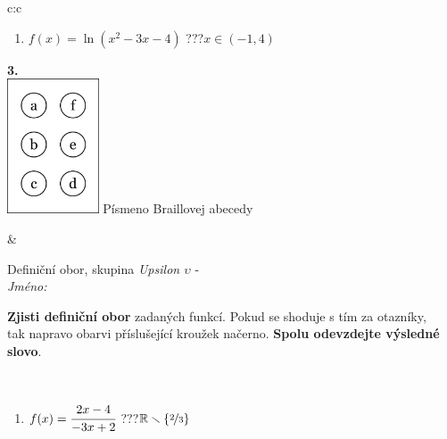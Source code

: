 \documentclass[10pt]{report}
\begin{document}
\begin{tabular}{c:c}
\begin{minipage}[c][104.5mm][t]{0.5\linewidth}
\begin{center}
\begin{minipage}{0.79\linewidth}
\begin{center}
\begin{varwidth}{\linewidth}
\begin{enumerate}
\item $f(x)=\ln{(x^2-3x-4)}$\quad \dotfill\; ???\;\dotfill \quad $x\in(-1 , 4)$
\end{enumerate}
\end{varwidth}
\end{center}
\end{minipage}
\begin{minipage}{0.20\linewidth}
\begin{center}
{\Huge\bfseries 3.} \\[2mm]
\includegraphics[height=40mm]{../images/braille.png}
{\small Písmeno Braillovej abecedy}
\end{center}
\end{minipage}
\end{center}
\end{minipage}
&
\begin{minipage}[c][104.5mm][t]{0.5\linewidth}
\begin{center}
\vspace{7mm}
{\huge Definiční obor, skupina \textit{Upsilon $\upsilon$} -}\\[5mm]
\textit{Jméno:}\phantom{xxxxxxxxxxxxxxxxxxxxxxxxxxxxxxxxxxxxxxxxxxxxxxxxxxxxxxxxxxxxxxxxx}\\[5mm]
\begin{minipage}{0.95\linewidth}
\begin{center}
\textbf{Zjisti definiční obor} zadaných funkcí. Pokud se shoduje s tím za otazníky,\\tak napravo obarvi příslušející kroužek načerno. \textbf{Spolu odevzdejte výsledné slovo}.
\end{center}
\end{minipage}
\\[1mm]
\begin{minipage}{0.79\linewidth}
\begin{center}
\begin{varwidth}{\linewidth}
\begin{enumerate}
\normalsizerrr
\item $f(x)=\cfrac{2x-4}{-3x+2}$\quad \dotfill\; ???\;\dotfill \quad $\mathbb{R}\smallsetminus\{\nicefrac{2}{3}\}$

\end{enumerate}
\end{varwidth}
\end{center}
\end{minipage}
\end{center}
\end{minipage}
\end{tabular}
\end{document}
